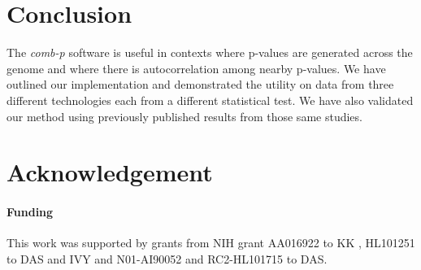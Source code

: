 \documentclass{bioinfo}
\begin{document}
\section{Conclusion}

The \textit{comb-p} software is useful in contexts where p-values are
generated across the genome and where there is autocorrelation among
nearby p-values. We have outlined our implementation and demonstrated
the utility on data from three different technologies each from a
different statistical test. We have also validated our method using
previously published results from those same studies.

\section*{Acknowledgement}

\paragraph{Funding\textcolon} This work was supported by grants from NIH grant AA016922 to KK
, HL101251 to DAS and IVY and N01-AI90052 and RC2-HL101715 to DAS.

%
%
%
%
%
%
%
\end{document}
